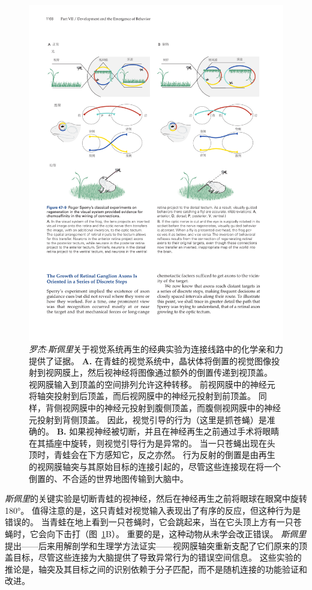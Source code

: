 \begin{figure}[htbp]
	\centering
	\includegraphics[width=0.95\linewidth]{chap47/fig_47_9}
	\caption{\textit{罗杰$\cdot$斯佩里}关于视觉系统再生的经典实验为连接线路中的化学亲和力提供了证据。
		\textbf{A.} 在青蛙的视觉系统中，晶状体将倒置的视觉图像投射到视网膜上，然后视神经将图像通过额外的倒置传递到视顶盖。
		视网膜输入到顶盖的空间排列允许这种转移。
		前视网膜中的神经元将轴突投射到后顶盖，而后视网膜中的神经元投射到前顶盖。
		同样，背侧视网膜中的神经元投射到腹侧顶盖，而腹侧视网膜中的神经元投射到背侧顶盖。
		因此，视觉引导的行为（这里是抓苍蝇）是准确的。
		\textbf{B.} 如果视神经被切断，并且在神经再生之前通过手术将眼睛在其插座中旋转，则视觉引导行为是异常的。
		当一只苍蝇出现在头顶时，青蛙会在下方感知它，反之亦然。
		行为反射的倒置是由再生的视网膜轴突与其原始目标的连接引起的，尽管这些连接现在将一个倒置的、不合适的世界地图传输到大脑中。}
	\label{fig:47_9}
\end{figure}


\textit{斯佩里}的关键实验是切断青蛙的视神经，然后在神经再生之前将眼球在眼窝中旋转 180°。
值得注意的是，这只青蛙对视觉输入表现出了有序的反应，但这种行为是错误的。
当青蛙在地上看到一只苍蝇时，它会跳起来，当在它头顶上方有一只苍蝇时，它会向下击打（图~\ref{fig:47_9}B）。
重要的是，这种动物从未学会改正错误。
\textit{斯佩里}提出——后来用解剖学和生理学方法证实——视网膜轴突重新支配了它们原来的顶盖目标，尽管这些连接为大脑提供了导致异常行为的错误空间信息。
这些实验的推论是，轴突及其目标之间的识别依赖于分子匹配，而不是随机连接的功能验证和改进。


